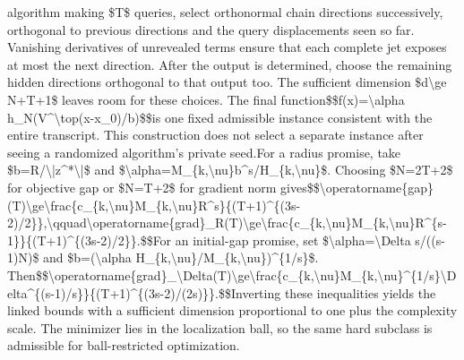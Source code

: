 \documentclass[10pt,a4paper]{article}
\begin{document}
algorithm making \$T\$ queries,\allowbreak{} select orthonormal chain directions successively,\allowbreak{} orthogonal to previous directions and the query displacements seen so far. Vanishing derivatives of unrevealed terms ensure that each complete jet exposes at most the next direction. After the output is determined,\allowbreak{} choose the remaining hidden directions orthogonal to that output too. The sufficient dimension \$d\textbackslash{}ge N+T+1\$ leaves room for these choices. The final function\newline{}\$\$f(x)=\allowbreak{}\textbackslash{}alpha h\_\allowbreak{}N(V\textasciicircum{}\textbackslash{}top(x-x\_\allowbreak{}0)/\allowbreak{}b)\$\$\newline{}is one fixed admissible instance consistent with the entire transcript. This construction does not select a separate instance after seeing a randomized algorithm's private seed.\newline{}\newline{}For a radius promise,\allowbreak{} take \$b=\allowbreak{}R/\allowbreak{}\textbackslash{}|z\textasciicircum{}*\textbackslash{}|\$ and \$\textbackslash{}alpha=\allowbreak{}M\_\allowbreak{}\{k,\allowbreak{}\textbackslash{}nu\}b\textasciicircum{}s/\allowbreak{}H\_\allowbreak{}\{k,\allowbreak{}\textbackslash{}nu\}\$. Choosing \$N=\allowbreak{}2T+2\$ for objective gap or \$N=\allowbreak{}T+2\$ for gradient norm gives\newline{}\$\$\textbackslash{}operatorname\{gap\}(T)\textbackslash{}ge\textbackslash{}frac\{c\_\allowbreak{}\{k,\allowbreak{}\textbackslash{}nu\}M\_\allowbreak{}\{k,\allowbreak{}\textbackslash{}nu\}R\textasciicircum{}s\}\{(T+1)\textasciicircum{}\{(3s-2)/\allowbreak{}2\}\},\allowbreak{}\textbackslash{}qquad\newline{}\textbackslash{}operatorname\{grad\}\_\allowbreak{}R(T)\textbackslash{}ge\textbackslash{}frac\{c\_\allowbreak{}\{k,\allowbreak{}\textbackslash{}nu\}M\_\allowbreak{}\{k,\allowbreak{}\textbackslash{}nu\}R\textasciicircum{}\{s-1\}\}\{(T+1)\textasciicircum{}\{(3s-2)/\allowbreak{}2\}\}.\$\$\newline{}For an initial-gap promise,\allowbreak{} set \$\textbackslash{}alpha=\allowbreak{}\textbackslash{}Delta s/\allowbreak{}((s-1)N)\$ and \$b=\allowbreak{}(\textbackslash{}alpha H\_\allowbreak{}\{k,\allowbreak{}\textbackslash{}nu\}/\allowbreak{}M\_\allowbreak{}\{k,\allowbreak{}\textbackslash{}nu\})\textasciicircum{}\{1/\allowbreak{}s\}\$. Then\newline{}\$\$\textbackslash{}operatorname\{grad\}\_\allowbreak{}\textbackslash{}Delta(T)\textbackslash{}ge\textbackslash{}frac\{c\_\allowbreak{}\{k,\allowbreak{}\textbackslash{}nu\}M\_\allowbreak{}\{k,\allowbreak{}\textbackslash{}nu\}\textasciicircum{}\{1/\allowbreak{}s\}\textbackslash{}Delta\textasciicircum{}\{(s-1)/\allowbreak{}s\}\}\{(T+1)\textasciicircum{}\{(3s-2)/\allowbreak{}(2s)\}\}.\$\$\newline{}Inverting these inequalities yields the linked bounds with a sufficient dimension proportional to one plus the complexity scale. The minimizer lies in the localization ball,\allowbreak{} so the same hard subclass is admissible for ball-restricted optimization.\par\endgroup
\end{document}
